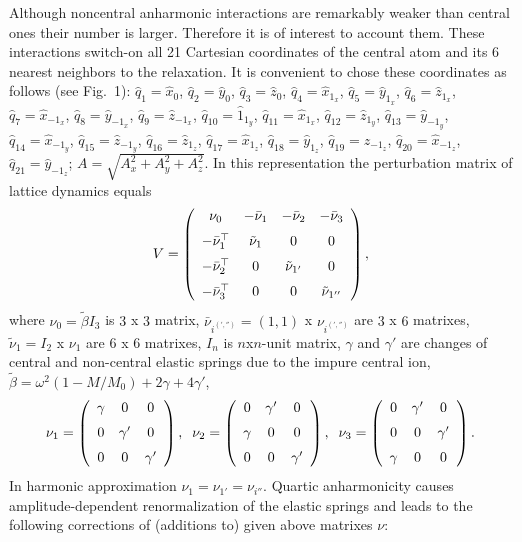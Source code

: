 Although noncentral anharmonic interactions are remarkably weaker than central 
ones their number is larger. Therefore it is of interest to account them.
These interactions  switch-on all 21 Cartesian coordinates of the central 
atom and its 6 nearest neighbors to the relaxation. It is convenient to chose 
these coordinates as follows (see Fig.~1):
$\hat{q}_{1} = \hat{x}_{0}$, 
$\hat{q}_{2} = \hat{y}_{0}$, 
$\hat{q}_{3} = \hat{z}_{0}$,
$\hat{q}_{4} = \hat{x}_{1_{x}}$, 
$\hat{q}_{5} = \hat{y}_{1_{x}}$,
$\hat{q}_{6} = \hat{z}_{1_{x}}$, 
$\hat{q}_{7} = \hat{x}_{-1_{x}}$, 
$\hat{q}_{8} = \hat{y}_{-1_{x}}$, 
$\hat{q}_{9} = \hat{z}_{-1_{x}}$,
$\hat{q}_{10} = \hat{1}_{1_{y}}$, 
$\hat{q}_{11} = \hat{x}_{1_{x}}$, 
$\hat{q}_{12} = \hat{z}_{1_{y}}$,
$\hat{q}_{13} = \hat{y}_{-1_{y}}$, 
$\hat{q}_{14} = \hat{x}_{-1_{y}}$,
$\hat{q}_{15} = \hat{z}_{-1_{y}}$, 
$\hat{q}_{16} = \hat{z}_{1_{z}}$, 
$\hat{q}_{17} = \hat{x}_{1_{z}}$, 
$\hat{q}_{18} = \hat{y}_{1_{z}}$, 
$\hat{q}_{19} = \hat{z}_{-1_{z}}$, 
$\hat{q}_{20} = \hat{x}_{-1_{z}}$, 
$\hat{q}_{21} = \hat{y}_{-1_{z}}$;
$A = \sqrt{A_{x}^{2}+A_{y}^{2}+A_{z}^{2}}$.
In this representation 
the perturbation matrix of lattice dynamics equals 
\[ V = \left (\begin{array}{cccc}
\nu_0&-\bar{\nu}_1&-\bar{\nu}_2&-\bar{\nu}_3\\\noalign{\medskip}
-\bar{\nu}_1^{\top}&\tilde{\nu}_1&0&0\\\noalign{\medskip}
-\bar{\nu}_2^{\top}&0&\tilde{\nu}_{1'}&0\\\noalign{\medskip}
-\bar{\nu}_3^{\top}&0&0&\tilde{\nu}_{1''}\end{array}
\right ) , \]
where $\nu_0 = \tilde{\beta} I_3$ is $3$ x $3$ matrix,  
$\bar{\nu}_{i^{(','')}} =(1,1)$ x $\nu_{i^{(','')}}$ are $3$ x $6$ matrixes,
$\tilde{\nu}_1 = I_2$ x $\nu_1$ are $6$ x $6$ matrixes,
$I_n$ is $n$x$n$-unit matrix,
$\gamma$ and 
$\gamma'$ are changes of central and non-central elastic springs due to the 
impure central ion, $\tilde{\beta} = \omega^2 (1-M/M_0) + 2\gamma + 4\gamma'$, 
\[ \nu_1 = \left (\begin{array}{ccc}
\gamma&0&0\\\noalign{\medskip}0&\gamma'&0\\\noalign{\medskip}0
&0&\gamma'\end {array}\right ),\;\;
\nu_2 = \left (\begin{array}{ccc}
0&\gamma'&0\\\noalign{\medskip}\gamma&0&0\\\noalign{\medskip}0
&0&\gamma'\end{array}\right ) ,\;\;
\nu_3 = \left (\begin{array}{ccc}
0&\gamma'&0\\\noalign{\medskip}0&0&\gamma'\\\noalign{\medskip}\gamma
&0&0\end{array}\right ) .\]
In harmonic approximation $\nu_1 = \nu_{1'} = \nu_{i''}$.
Quartic anharmonicity causes amplitude-dependent renormalization
of the elastic springs and leads to the following corrections of
(additions to) given above matrixes $\nu$:  

